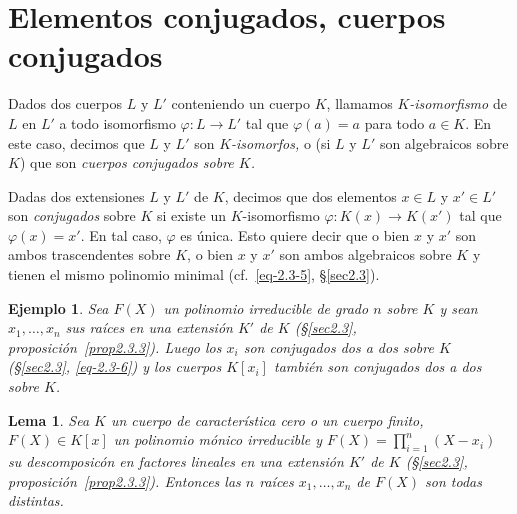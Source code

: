 \documentclass[oneside,bibtotoc,leqno,spanish]{amsbook}
\renewcommand{\to}[1][]{\xrightarrow{#1}}
\numberwithin{equation}{section}
\theoremstyle{defi}
\theoremstyle{note}
\newtheorem*{lemma*}{Lema}
\theoremstyle{rem}
\newtheorem*{example*}{Ejemplo}
\numberwithin{theorem}{section}
\numberwithin{proposition}{section}
\numberwithin{definition}{section}
\numberwithin{lemma}{section}
\numberwithin{corollary}{section}
\numberwithin{example}{section}
\numberwithin{footnote}{section}%
\begin{document}
\section{Elementos conjugados, cuerpos conjugados}\label{sec2.4}

Dados dos cuerpos $L$ y $L'$ conteniendo un cuerpo $K$, llamamos {\em $K$-isomorfismo} de $L$ en $L'$
a todo isomorfismo $\varphi:L\to L'$ tal que $\varphi(a) = a$ para todo $a\in K$. En este caso, decimos que
$L$ y $L'$ son {\em $K$-isomorfos,} o (si $L$ y $L'$ son algebraicos sobre $K$) que son {\em cuerpos conjugados
sobre $K$.}

Dadas dos extensiones $L$ y $L'$ de $K$, decimos que dos elementos $x\in L$ y $x'\in L'$ son {\em conjugados}
sobre $K$ si existe un $K$-isomorfismo $\varphi:K(x)\to K(x')$ tal que $\varphi(x) = x'$. En tal caso,
$\varphi$ es \'unica. Esto quiere decir que o bien $x$ y $x'$ son ambos trascendentes sobre $K$,
o bien $x$ y $x'$ son ambos algebraicos sobre $K$ y tienen el mismo polinomio minimal (cf.~\eqref{eq-2.3-5}, \S\ref{sec2.3}).

\begin{example*}
Sea $F(X)$ un polinomio \emph{irreducible} de grado $n$ sobre $K$ y sean
$x_{1},\dots,x_{n}$ sus ra\'ices en una extensi\'on $K'$ de $K$ (\S\ref{sec2.3}, proposici\'on~\ref{prop2.3.3}). Luego los $x_{i}$
son conjugados dos a dos sobre $K$ (\S\ref{sec2.3}, \eqref{eq-2.3-6}) y los cuerpos $K[x_{i}]$ tambi\'en son conjugados
dos a dos sobre $K$.
\end{example*}

\begin{lemma*}
Sea $K$ un cuerpo de caracter\'istica cero o un cuerpo finito, $F(X)\in K[x]$ un polinomio m\'onico
irreducible y $F(X) = \prod_{i=1}^{n}(X-x_{i})$ su descomposic\'on en factores lineales en una extensi\'on
$K'$ de $K$ (\S\ref{sec2.3}, proposici\'on~\ref{prop2.3.3}). Entonces
las $n$ ra\'ices $x_{1},\dots,x_{n}$ de $F(X)$ son todas distintas.
\end{lemma*}
\end{document}
